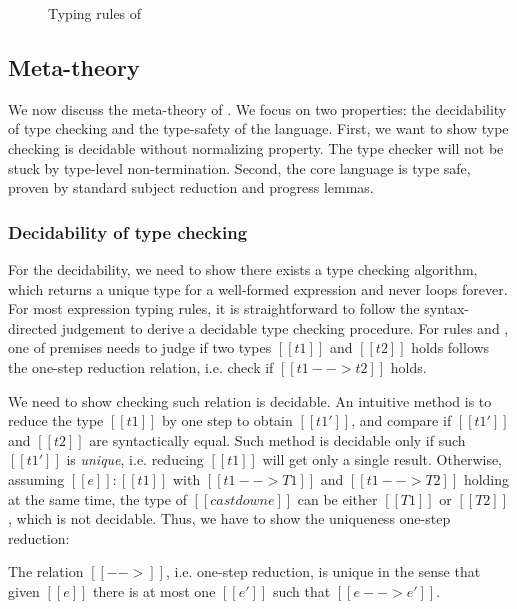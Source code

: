 \begin{figure}
    \ottdefnctx{}
    \ottdefnexpr{}
    \caption{Typing rules of \name}
    \label{fig:core:typing}
\end{figure}

\subsection{Meta-theory}\label{sec:core:meta}
We now discuss the meta-theory of \name. We focus on two properties: the decidability of type checking and the type-safety of the language. First, we want to show type checking \name is decidable without normalizing property. The type checker will not be stuck by type-level non-termination. Second, the core language is type safe, proven by standard subject reduction and progress lemmas.

\subsubsection{Decidability of type checking}
For the decidability, we need to show there exists a type checking algorithm, which returns a unique type for a well-formed expression and never loops forever. For most expression typing rules, it is straightforward to follow the syntax-directed judgement to derive a decidable type checking procedure. For rules  and , one of premises needs to judge if two types $[[t1]]$ and $[[t2]]$ holds follows the one-step reduction relation, i.e. check if $[[t1 --> t2]]$ holds.

We need to show checking such relation is decidable. An intuitive method is to reduce the type $[[t1]]$ by one step to obtain $[[t1']]$, and compare if $[[t1']]$ and $[[t2]]$ are syntactically equal. Such method is decidable only if such $[[t1']]$ is \emph{unique}, i.e. reducing $[[t1]]$ will get only a single result. Otherwise, assuming $[[e]]:[[t1]]$ with $[[t1 --> T1]]$ and $[[t1 --> T2]]$ holding at the same time, the type of $[[castdown e]]$ can be either $[[T1]]$ or $[[T2]]$, which is not decidable. Thus, we have to show the uniqueness one-step reduction:

\begin{lem}\label{lem:core:unique}
	The relation $[[-->]]$, i.e. one-step reduction, is unique in the sense that given $[[e]]$ there is at most one $[[e']]$ such that $[[e --> e']]$.
\end{lem}

